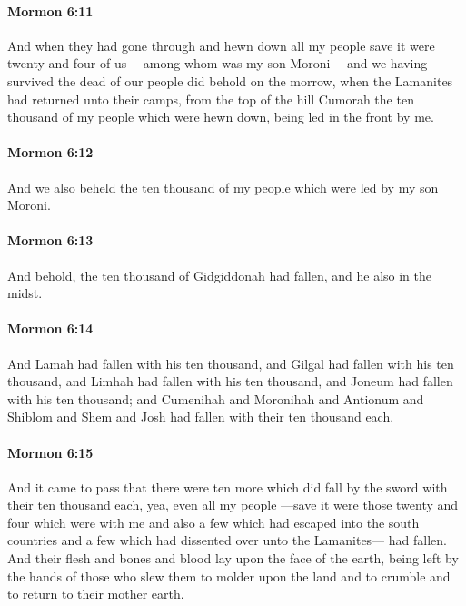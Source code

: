 		\paragraph{Mormon 6:11} %
			\label{MORMON-6-11}

			And when they had gone through and hewn down all my people
			save it were twenty and four of us
			---among whom was my son Moroni---
			and we having survived the dead of our people
			did behold on the morrow,
			when the Lamanites had returned unto their camps,
			from the top of the hill Cumorah
			the ten thousand of my people which were hewn down,
			being led in the front by me.

		\paragraph{Mormon 6:12} %
			\label{MORMON-6-12}

			And we also beheld the ten thousand of my people
			which were led by my son Moroni.

		\paragraph{Mormon 6:13} %
			\label{MORMON-6-13}

			And behold, the ten thousand of Gidgiddonah had fallen,
			and he also in the midst.

		\paragraph{Mormon 6:14} %
			\label{MORMON-6-14}

			And Lamah had fallen with his ten thousand,
			and Gilgal had fallen with his ten thousand,
			and Limhah had fallen with his ten thousand,
			and Joneum had fallen with his ten thousand;
			and Cumenihah and Moronihah and Antionum
			and Shiblom and Shem and Josh
			had fallen with their ten thousand each.

		\paragraph{Mormon 6:15} %
			\label{MORMON-6-15}

			And it came to pass that there were ten more
			which did fall by the sword with their ten thousand each,
			yea, even all my people
			---save it were those twenty and four which were with me
			and also a few which had escaped into the south countries
			and a few which had dissented over unto the Lamanites---
			had fallen.
			And their flesh and bones and blood lay upon the face of the earth,
			being left by the hands of those who slew them
			to molder upon the land and to crumble and to return to their mother earth.

